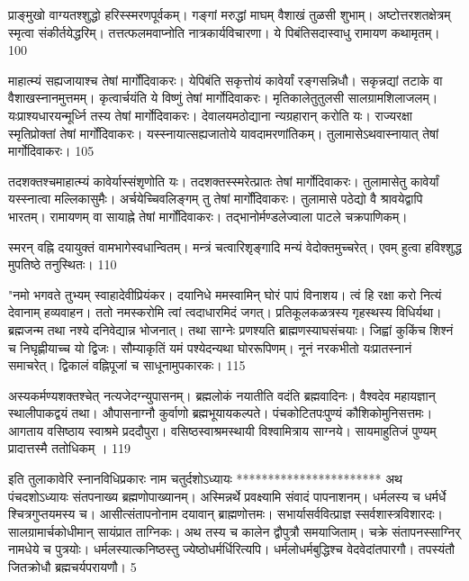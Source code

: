 प्राङ्मुखो वाग्यतश्शुद्धो हरिस्स्मरणपूर्वकम्।
 गङ्गां मरुद्धां माघम् वैशाखं तुळसी शुभाम्।
 अष्टोत्तरशतक्षेत्रम् स्मृत्वा संकीर्तयेद्धरिम्।
 तत्तत्फलमवाप्नोति नात्रकार्यविचारणा।
 ये पिबंतिसदास्वाधु रामायण कथामृतम्।
 100

  माहात्म्यं सह्यजायाश्च तेषां मार्गोंदिवाकरः।
 येपिबंति सकृत्तोयं कावेर्यां रङ्गसन्निधौ।
 सकृन्नद्यां तटाके वा वैशाखस्नानमुत्तमम्।
 कृत्वार्चयंति ये विष्णुं तेषां मार्गोदिवाकरः।
 मृतिकालेतुतुलसी सालग्रामशिलाजलम्।
 यःप्राश्यधारयन्मूर्ध्नि तस्य तेषां मार्गोदिवाकरः।
 देवालयमठोद्याना न्यग्रहारान् करोति यः।
 राज्यरक्षा स्मृतिप्रोक्तां तेषां मार्गोंदिवाकरः।
 यस्स्नायात्सह्यजातोये यावदामरणांतिकम्।
 तुलामासेऽथवास्नायात् तेषां मार्गोदिवाकरः।
 105

  तदशक्तश्चमाहात्म्यं कावेर्यास्संशृणोति यः।
 तदशक्तस्स्मरेत्प्रातः तेषां मार्गोदिवाकरः।
 तुलामासेतु कावेर्यां यस्स्नात्वा मल्लिकासुमैः।
 अर्चयेच्चिवलिङ्गम् तु तेषां मार्गोंदिवाकरः।
 तुलामासे पठेद्यो वै श्रावयेद्वापि भारतम्।
 रामायणम् वा सायाह्ने तेषां मार्गोंदिवाकरः।
 तद्भानोर्मण्डलेज्वाला पाटले चक्रपाणिकम्।
 
स्मरन् वह्नि दयायुक्तं वामभागेस्वधान्वितम्।
 मन्त्रं चत्वारिशृङ्गादि मन्यं वेदोक्तमुच्चरेत्।
 एवम् हुत्वा हविश्शुद्ध मुपतिष्ठे तनुस्थितः।
 110

  "नमो भगवते तुभ्यम् स्वाहादेवीप्रियंकर।
 दयानिधे ममस्वामिन् घोरं पापं विनाशय।
 त्वं हि रक्षा करो नित्यं देवानाम् हव्यवाहन।
 ततो नमस्करोमि त्वां त्वदाधारमिदं जगत्।
 प्रतिकूलकळत्रस्य गृहस्थस्य विधिर्यथा।
 ब्रह्मजन्म तथा नश्ये दनिवेद्यान्न भोजनात्।
 तथा साग्नेः प्रणश्यति ब्राह्मणस्याघसंचयाः।
 जिह्वां कुकिंच शिश्नं च निघृह्णीयाच्च यो द्विजः।
 सौम्याकृतिं यमं पश्येदन्यथा घोररूपिणम्।
 नूनं नरकभीतो यःप्रातस्नानं समाचरेत्।
 द्विकालं वह्निपूजां च साधूनामुपकारकः।
 115

  अस्यकर्मण्यशक्तश्चेत् नत्यजेदग्न्युपासनम्।
 ब्रह्मलोकं नयातीति वदंति ब्रह्मवादिनः।
 वैश्वदेव महायज्ञान् स्थालीपाकद्वयं तथा।
 औपासनाग्नौ कुर्वाणो ब्रह्मभूयायकल्पते।
 पंचकोटितपःपुण्यं कौशिकोमुनिसत्तमः।
 आगताय वसिष्ठाय स्वाश्रमे प्रददौपुरा।
 वसिष्ठस्वाश्रमस्थायी विश्वामित्राय साग्नये।
 सायमाहुतिजं पुण्यम् प्रादात्तस्मै ततोधिकम् ।
 119

 
इति तुलाकावेरि स्नानविधिप्रकारः नाम
चतुर्दशोऽध्यायः
***********************
अथ पंचदशोऽध्यायः
संतपनाख्य ब्रह्मणोपाख्यानम्।
 अस्मिन्नर्थे प्रवक्ष्यामि संवादं पापनाशनम्।
 धर्मलस्य च धर्मर्धे श्चित्रगुप्तयमस्य च।
 आसीत्संतापनोनाम दयावान् ब्राह्मणोत्तमः।
 सभार्यासर्ववित्प्राज्ञ स्सर्वशास्त्रविशारदः।
 सालग्रामार्चकोधीमान् सायंप्रात ताग्निकः।
 अथ तस्य च कालेन द्वौपुत्रौ समयाजिताम्।
 चक्रे संतापनस्साग्निर् नामधेये च पुत्रयोः।
 धर्मलस्यात्कनिष्ठस्तु ज्येष्ठोधर्मर्धिरित्यपि।
 धर्मलोधर्मबुद्धिश्च वेदवेदांतपारगौ।
 तपस्यंतौ जितक्रोधौ ब्रह्मचर्यपरायणौ।
 5

